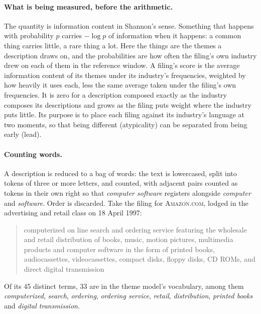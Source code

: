 \paragraph{What is being measured, before the arithmetic.} The quantity is
information content in Shannon's sense. Something that happens with
probability $p$ carries $-\log p$ of information when it happens: a common
thing carries little, a rare thing a lot. Here the things are the themes a
description draws on, and the probabilities are how often the filing's own
industry drew on each of them in the reference window. A filing's score is the
average information content of its themes under its industry's frequencies,
weighted by how heavily it uses each, less the same average taken under the
filing's own frequencies. It is zero for a description composed
exactly as the industry composes its descriptions and grows as the filing puts
weight where the industry puts little. Its purpose is to place each filing
against its industry's language at two moments, so that being different
(atypicality) can be separated from being early (lead).

\paragraph{Counting words.} A description is reduced to a bag of words: the
text is lowercased, split into tokens of three or more letters, and counted,
with adjacent pairs counted as tokens in their own right so that
\emph{computer software} registers alongside \emph{computer} and
\emph{software}. Order is discarded. Take the filing for \textsc{Amazon.com},
lodged in the advertising and retail class on 18 April 1997:

\begin{quote}\small
computerized on line search and ordering service featuring the wholesale and
retail distribution of books, music, motion pictures, multimedia products and
computer software in the form of printed books, audiocassettes,
videocassettes, compact disks, floppy disks, CD ROMs, and direct digital
transmission
\end{quote}

\noindent Of its 45 distinct terms, 33 are in the theme model's vocabulary,
among them \emph{computerized},
\emph{search}, \emph{ordering}, \emph{ordering service}, \emph{retail},
\emph{distribution}, \emph{printed books} and \emph{digital transmission}.

